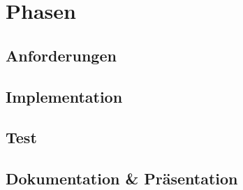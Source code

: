 \chapter{Phasen}
\section{Anforderungen}
\section{Implementation}
\section{Test}
\section{Dokumentation \& Pr\"asentation}